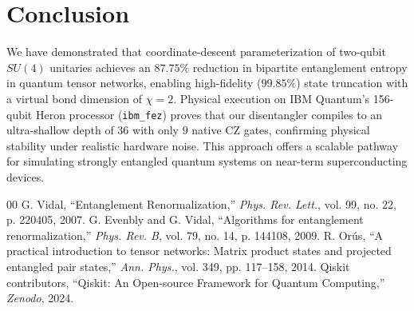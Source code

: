 \documentclass[conference]{IEEEtran}
\begin{document}
\section{Conclusion}
We have demonstrated that coordinate-descent parameterization of two-qubit $SU(4)$ unitaries achieves an $87.75\%$ reduction in bipartite entanglement entropy in quantum tensor networks, enabling high-fidelity ($99.85\%$) state truncation with a virtual bond dimension of $\chi=2$. Physical execution on IBM Quantum's 156-qubit Heron processor (\texttt{ibm\_fez}) proves that our disentangler compiles to an ultra-shallow depth of $36$ with only $9$ native CZ gates, confirming physical stability under realistic hardware noise. This approach offers a scalable pathway for simulating strongly entangled quantum systems on near-term superconducting devices.

\begin{thebibliography}{00}
 G. Vidal, ``Entanglement Renormalization,'' \textit{Phys. Rev. Lett.}, vol. 99, no. 22, p. 220405, 2007.
 G. Evenbly and G. Vidal, ``Algorithms for entanglement renormalization,'' \textit{Phys. Rev. B}, vol. 79, no. 14, p. 144108, 2009.
 R. Or\'us, ``A practical introduction to tensor networks: Matrix product states and projected entangled pair states,'' \textit{Ann. Phys.}, vol. 349, pp. 117--158, 2014.
 Qiskit contributors, ``Qiskit: An Open-source Framework for Quantum Computing,'' \textit{Zenodo}, 2024.
\end{thebibliography}
\end{document}
